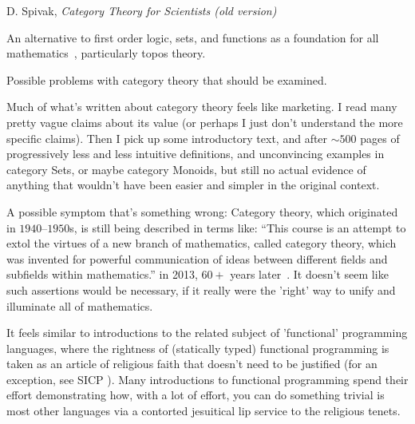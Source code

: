 \documentclass[11pt,openany]{article}
\begin{document}
{D. Spivak, \textit{Category Theory for Scientists 
(old version)}~\cite{spivakd-2013}}

\pagebreak
An alternative to first order logic, sets, 
and functions as a foundation for all
mathematics~\cite{feferman1977Categorical},  
particularly topos theory.


\setcounter{currentlevel}{\value{baseSectionLevel}}
\label{sec:Doubts}

Possible problems with category theory that should be examined.


\label{sec:Hype}

Much of what's written about category theory feels like marketing.
I read many pretty vague claims about its value
(or perhaps I just don't understand the more specific claims).
Then I pick up some introductory text,
and after $\sim 500$ pages of progressively less and less 
intuitive definitions, and unconvincing examples in category Sets,
or maybe category Monoids,
but still no actual evidence of anything that wouldn't have been
easier and simpler in the original context.

A possible symptom that's something wrong:
Category theory, which originated in $1940$--$1950$s,
is still being described in terms like:
``This course is an attempt to extol the virtues of a new branch of mathematics,
called category theory, which was invented for powerful communication of ideas between
different fields and subfields within mathematics.''
in 2013, $60+$ years later~\cite{spivakd-2013}.
It doesn't seem like such assertions would be necessary,
if it really were the 'right' way to unify 
and illuminate all of mathematics.

It feels similar to introductions to the related subject of
'functional' programming languages,
where the rightness of (statically typed) functional programming 
is taken as
an article of religious faith that doesn't need to be justified
(for an exception, see SICP \cite{Abelson1996}).
Many introductions to functional programming spend their
effort demonstrating how, with a lot of effort, you can do
something trivial is most other languages
via a contorted jesuitical lip service to the religious tenets.

\label{sec:Shaky-foundations}
\end{document}

